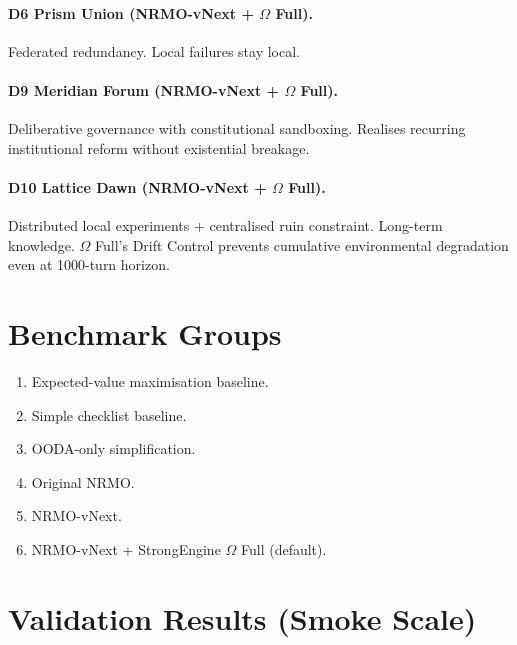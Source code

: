 \paragraph{D6 Prism Union (NRMO-vNext + $\Omega$ Full).}
Federated redundancy. Local failures stay local.

\paragraph{D9 Meridian Forum (NRMO-vNext + $\Omega$ Full).}
Deliberative governance with constitutional sandboxing. Realises
recurring institutional reform without existential breakage.

\paragraph{D10 Lattice Dawn (NRMO-vNext + $\Omega$ Full).}
Distributed local experiments + centralised ruin constraint.
Long-term knowledge. $\Omega$ Full's Drift Control prevents
cumulative environmental degradation even at 1000-turn horizon.

\section{Benchmark Groups}
\label{sec:omega-benchmark-groups}

\begin{enumerate}
\item Expected-value maximisation baseline.
\item Simple checklist baseline.
\item OODA-only simplification.
\item Original NRMO.
\item NRMO-vNext.
\item NRMO-vNext + StrongEngine $\Omega$ Full (default).
\end{enumerate}

\section{Validation Results (Smoke Scale)}
\label{sec:omega-validation-results}



